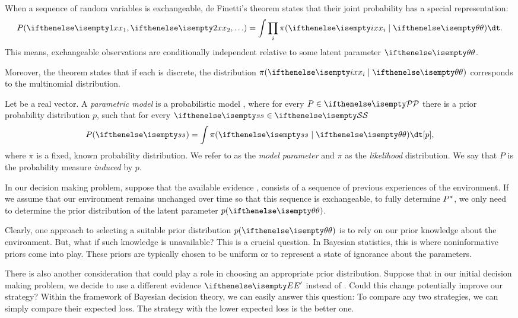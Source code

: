 When a sequence of random variables is exchangeable, de Finetti's theorem states that their joint probability has a
special representation:
\begin{equation*}
    P(\seqRvalInf) = \int \prod_i\post \dt.
\end{equation*}
This means, exchangeable observations are conditionally independent relative to some latent parameter $\paramValue$.

Moreover, the theorem states that if each  is discrete, the distribution $\post$ corresponds to the multinomial
distribution.

\begin{definition}
    \label{def:param-model}
    Let \param be a real vector.
    A \emph{parametric model} is a probabilistic model \pmodel, where for every $P \in \set{P}$ there is a prior
    probability distribution $p$, such that for every $\rval[]{s} \in \set{s}$
    \begin{equation}
        \marginalEq{\rval[]{s}},
        \label{eq:parametric}
    \end{equation}
    where $\pi$ is a fixed, known probability distribution.
    We refer to \param as the \emph{model parameter} and $\pi$ as the \emph{likelihood} distribution.
    We say that $P$ is the probability measure \emph{induced} by $p$.
\end{definition}

In our decision making problem, suppose that the available evidence \E, consists of a sequence of previous experiences
of the environment.
If we assume that our environment remains unchanged over time so that this sequence is exchangeable,
to fully determine $P^*$, we only need to determine the prior distribution of the latent parameter $\prior$.

Clearly, one approach to selecting a suitable prior distribution $\prior$ is to rely on our prior knowledge about the
environment.
But, what if such knowledge is unavailable?
This is a crucial question.
In Bayesian statistics, this is where noninformative priors come into play.
These priors are typically chosen to be uniform or to represent a state of ignorance about the parameters.

There is also another consideration that could play a role in choosing an appropriate prior distribution.
Suppose that in our initial decision making problem, we decide to use a different
evidence $\E'$ instead of \E.
Could this change potentially improve our strategy?
Within the framework of Bayesian decision theory, we can easily answer this question:
To compare any two strategies, we can simply compare their expected loss.
The strategy with the lower expected loss is the better one.

